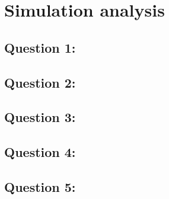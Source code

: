 \section{Simulation analysis}
\label{sec:simulation}

\subsection{Question 1: }
\subsection{Question 2: }
\subsection{Question 3: }
\subsection{Question 4: }
\subsection{Question 5: }

